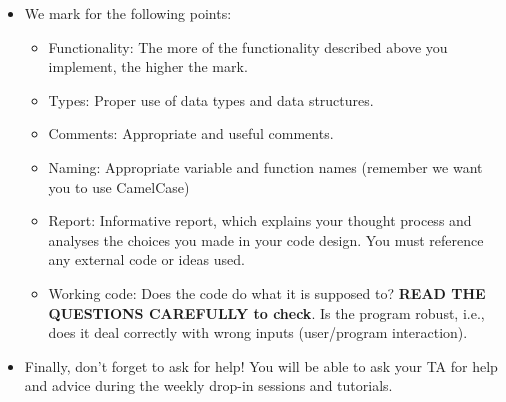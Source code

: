 \documentclass[11pt]{report}
\begin{document}
\begin{itemize}
	\vspace{0.5em}
	{\tt def SomeFunction(SomeArgument):}\\
	{\tt \hspace*{2em}"""}\\
	{\tt \hspace*{2em}This function does ...}\\
	{\tt \hspace*{2em}....and it does this....}\\
	{\tt \hspace*{2em}"""}
	\vspace{0.5em}
	
	\item We mark for the following points:
	\begin{itemize}
	    \item Functionality: The more of the functionality described above you implement, the higher the mark.
	    \item Types: Proper use of data types and data structures. 
	    \item Comments: Appropriate and useful comments. 
	    \item Naming: Appropriate variable and function names (remember we want you to use CamelCase)
	    \item Report: Informative report, which explains your thought process and analyses the choices you made in your code design. You must reference any external code or ideas used.
	    \item Working code: Does the code do what it is supposed to? {\bf READ THE QUESTIONS CAREFULLY to check}. Is the program robust, i.e., does it deal correctly with wrong inputs (user/program interaction).
	\end{itemize}
	
	\item Finally, don't forget to ask for help! You will be able to ask your TA for help and advice during the weekly drop-in sessions and tutorials. 
\end{itemize}
\end{document}
